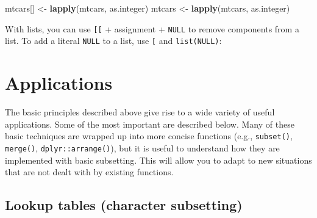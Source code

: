 \documentclass[]{book}
\newenvironment{Shaded}{\begin{snugshade}}{\end{snugshade}}
\newcommand{\CommentTok}[1]{\textcolor[rgb]{0.56,0.35,0.01}{\textit{#1}}}
\newcommand{\DataTypeTok}[1]{\textcolor[rgb]{0.13,0.29,0.53}{#1}}
\newcommand{\DecValTok}[1]{\textcolor[rgb]{0.00,0.00,0.81}{#1}}
\newcommand{\KeywordTok}[1]{\textcolor[rgb]{0.13,0.29,0.53}{\textbf{#1}}}
\newcommand{\NormalTok}[1]{#1}
\newcommand{\OtherTok}[1]{\textcolor[rgb]{0.56,0.35,0.01}{#1}}
\newcommand{\StringTok}[1]{\textcolor[rgb]{0.31,0.60,0.02}{#1}}
\theoremstyle{definition}
\theoremstyle{definition}
\theoremstyle{definition}
\theoremstyle{remark}
\begin{document}
\begin{Shaded}
\begin{Highlighting}[]
\NormalTok{mtcars[] <-}\StringTok{ }\KeywordTok{lapply}\NormalTok{(mtcars, as.integer)}
\NormalTok{mtcars <-}\StringTok{ }\KeywordTok{lapply}\NormalTok{(mtcars, as.integer)}
\end{Highlighting}
\end{Shaded}

With lists, you can use \texttt{{[}{[}} + assignment + \texttt{NULL} to
remove components from a list. To add a literal \texttt{NULL} to a list,
use \texttt{{[}} and \texttt{list(NULL)}:

\begin{Shaded}
\end{Shaded}

\hypertarget{applications}{%
\section{Applications}\label{applications}}

The basic principles described above give rise to a wide variety of
useful applications. Some of the most important are described below.
Many of these basic techniques are wrapped up into more concise
functions (e.g., \texttt{subset()}, \texttt{merge()},
\texttt{dplyr::arrange()}), but it is useful to understand how they are
implemented with basic subsetting. This will allow you to adapt to new
situations that are not dealt with by existing functions.

\hypertarget{lookup-tables-character-subsetting}{%
\subsection{Lookup tables (character
subsetting)}\label{lookup-tables-character-subsetting}}
\end{document}
